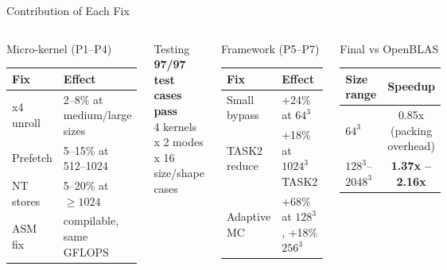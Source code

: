 \documentclass[aspectratio=169]{beamer}
\begin{document}
\begin{frame}{Contribution of Each Fix}
  \begin{columns}
    \begin{block}{Micro-kernel (P1--P4)}
      \footnotesize
      \begin{tabular}{ll}
        \toprule
        Fix & Effect \\
        \midrule
        x4 unroll & 2--8\% at medium/large sizes \\
        Prefetch  & 5--15\% at 512--1024 \\
        NT stores & 5--20\% at $\geq 1024$ \\
        ASM fix   & compilable, same GFLOPS \\
        \bottomrule
      \end{tabular}
    \end{block}
    \vspace{0.3cm}
    \begin{block}{Testing}
      \textbf{97/97 test cases pass}\\
      \footnotesize 4 kernels x 2 modes x 16 size/shape cases
    \end{block}

    \begin{block}{Framework (P5--P7)}
      \footnotesize
      \begin{tabular}{ll}
        \toprule
        Fix & Effect \\
        \midrule
        Small bypass & \textcolor{good}{+24\%} at $64^3$ \\
        TASK2 reduce & \textcolor{good}{+18\%} at $1024^3$ TASK2 \\
        Adaptive MC  & \textcolor{good}{+68\%} at $128^3$, +18\% $256^3$ \\
        \bottomrule
      \end{tabular}
    \end{block}
    \vspace{0.2cm}
    \begin{block}{Final vs OpenBLAS}
      \footnotesize
      \begin{tabular}{lc}
        \toprule
        Size range & Speedup \\
        \midrule
        $64^3$ & \textcolor{bad}{0.85x} (packing overhead) \\
        $128^3$--$2048^3$ & \textcolor{good}{\textbf{1.37x -- 2.16x}} \\
        \bottomrule
      \end{tabular}
    \end{block}
  \end{columns}
\end{frame}
\end{document}
